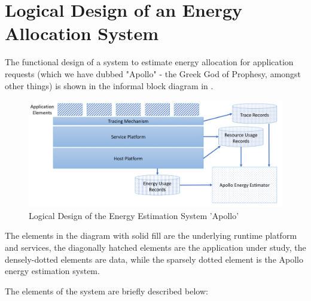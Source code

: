 \section{Logical Design of an Energy Allocation System}

The functional design of a system to estimate energy allocation for application requests (which we have dubbed "Apollo" - the Greek God of Prophesy, amongst other things) is shown in the informal block diagram in .

\begin{figure}
\centering
\includegraphics[width=\textwidth]{Figures/estimating-energy-logical}
\caption{Logical Design of the Energy Estimation System 'Apollo'}
\label{figure:logicaldesign}
\end{figure}

The elements in the diagram with solid fill are the underlying runtime platform and services, the diagonally hatched elements are the application under study, the densely-dotted elements are data, while the sparsely dotted element is the Apollo energy estimation system.

The elements of the system are briefly described below:

